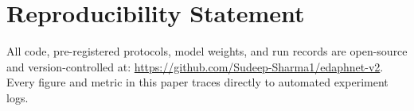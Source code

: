 \documentclass[journal,twoside]{IEEEtran}
\begin{document}
\section*{Reproducibility Statement}
All code, pre-registered protocols, model weights, and run records are open-source and version-controlled at: \url{https://github.com/Sudeep-Sharma1/edaphnet-v2}. Every figure and metric in this paper traces directly to automated experiment logs.



\end{document}
